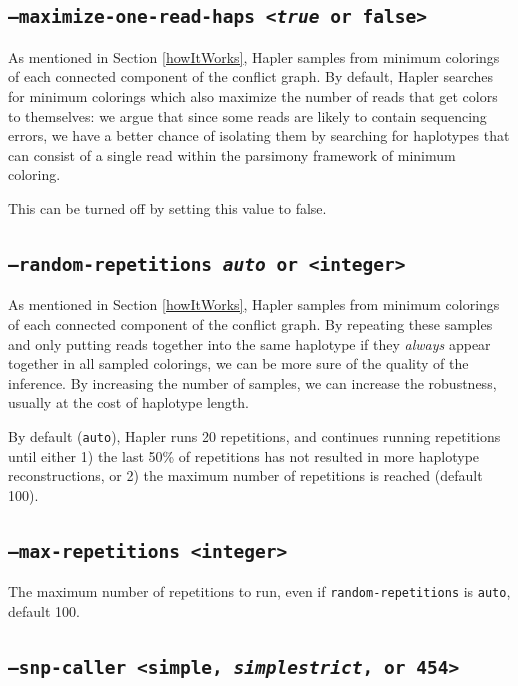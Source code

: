\documentclass[11pt]{llncs}
\begin{document}
\subsection{\texttt{--maximize-one-read-haps <\emph{true} or false>}}

As mentioned in Section \ref{howItWorks}, Hapler samples from minimum colorings of each connected component of the conflict graph.
By default, Hapler searches for minimum colorings which also maximize the number of reads that get colors to themselves: we argue that
since some reads are likely to contain sequencing errors, we have a better chance of isolating them by searching for haplotypes that can 
consist of a single read within the parsimony framework of minimum coloring.

This can be turned off by setting this value to false.

\subsection{\texttt{--random-repetitions \emph{auto} or <integer>}}

As mentioned in Section \ref{howItWorks}, Hapler samples from minimum colorings of each connected component of the conflict graph.
By repeating these samples and only putting reads together into the same haplotype if they \emph{always} appear together in all
sampled colorings, we can be more sure of the quality of the inference. By increasing the number of samples, we can increase the robustness,
usually at the cost of haplotype length.

By default (\texttt{auto}), Hapler runs 20 repetitions, and continues running repetitions until either 1) the last 50\% of repetitions has not resulted
in more haplotype reconstructions, or 2) the maximum number of repetitions is reached (default 100).

\subsection{\texttt{--max-repetitions <integer>}}

The maximum number of repetitions to run, even if \texttt{random-repetitions} is \texttt{auto}, default 100.


\subsection{\texttt{--snp-caller <simple, \emph{simplestrict}, or 454>}}
\end{document}
